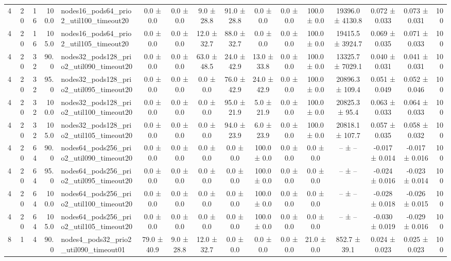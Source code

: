 \begin{tabular}{r r r r l c c c c c c c c c c r}
4 & 20 & 16 & 100.0 & nodes16\_pods64\_prio2\_util100\_timeout20 & 0.0 ± 0.0 & 0.0 ± 0.0 & 9.0 ± 28.8 & 91.0 ± 28.8 & 0.0 ± 0.0 & 0.0 ± 0.0 & 100.0 ± 0.0 & 19396.0 ± 4130.8 & 0.072 ± 0.033 & 0.073 ± 0.031 & 100 \\
4 & 20 & 16 & 105.0 & nodes16\_pods64\_prio2\_util105\_timeout20 & 0.0 ± 0.0 & 0.0 ± 0.0 & 12.0 ± 32.7 & 88.0 ± 32.7 & 0.0 ± 0.0 & 0.0 ± 0.0 & 100.0 ± 0.0 & 19415.5 ± 3924.7 & 0.069 ± 0.035 & 0.071 ± 0.033 & 100 \\
4 & 20 & 32 & 90.0 & nodes32\_pods128\_prio2\_util090\_timeout20 & 0.0 ± 0.0 & 0.0 ± 0.0 & 63.0 ± 48.5 & 24.0 ± 42.9 & 13.0 ± 33.8 & 0.0 ± 0.0 & 100.0 ± 0.0 & 13325.7 ± 7029.1 & 0.040 ± 0.031 & 0.041 ± 0.031 & 100 \\
4 & 20 & 32 & 95.0 & nodes32\_pods128\_prio2\_util095\_timeout20 & 0.0 ± 0.0 & 0.0 ± 0.0 & 0.0 ± 0.0 & 76.0 ± 42.9 & 24.0 ± 42.9 & 0.0 ± 0.0 & 100.0 ± 0.0 & 20896.3 ± 109.4 & 0.051 ± 0.049 & 0.052 ± 0.046 & 100 \\
4 & 20 & 32 & 100.0 & nodes32\_pods128\_prio2\_util100\_timeout20 & 0.0 ± 0.0 & 0.0 ± 0.0 & 0.0 ± 0.0 & 95.0 ± 21.9 & 5.0 ± 21.9 & 0.0 ± 0.0 & 100.0 ± 0.0 & 20825.3 ± 95.4 & 0.063 ± 0.033 & 0.064 ± 0.033 & 100 \\
4 & 20 & 32 & 105.0 & nodes32\_pods128\_prio2\_util105\_timeout20 & 0.0 ± 0.0 & 0.0 ± 0.0 & 0.0 ± 0.0 & 94.0 ± 23.9 & 6.0 ± 23.9 & 0.0 ± 0.0 & 100.0 ± 0.0 & 20818.1 ± 107.7 & 0.057 ± 0.035 & 0.058 ± 0.032 & 100 \\
4 & 20 & 64 & 90.0 & nodes64\_pods256\_prio2\_util090\_timeout20 & 0.0 ± 0.0 & 0.0 ± 0.0 & 0.0 ± 0.0 & 0.0 ± 0.0 & 100.0 ± 0.0 & 0.0 ± 0.0 & 0.0 ± 0.0 & -- ± -- & -0.017 ± 0.014 & -0.017 ± 0.016 & 100 \\
4 & 20 & 64 & 95.0 & nodes64\_pods256\_prio2\_util095\_timeout20 & 0.0 ± 0.0 & 0.0 ± 0.0 & 0.0 ± 0.0 & 0.0 ± 0.0 & 100.0 ± 0.0 & 0.0 ± 0.0 & 0.0 ± 0.0 & -- ± -- & -0.024 ± 0.016 & -0.023 ± 0.014 & 100 \\
4 & 20 & 64 & 100.0 & nodes64\_pods256\_prio2\_util100\_timeout20 & 0.0 ± 0.0 & 0.0 ± 0.0 & 0.0 ± 0.0 & 0.0 ± 0.0 & 100.0 ± 0.0 & 0.0 ± 0.0 & 0.0 ± 0.0 & -- ± -- & -0.028 ± 0.018 & -0.026 ± 0.015 & 100 \\
4 & 20 & 64 & 105.0 & nodes64\_pods256\_prio2\_util105\_timeout20 & 0.0 ± 0.0 & 0.0 ± 0.0 & 0.0 ± 0.0 & 0.0 ± 0.0 & 100.0 ± 0.0 & 0.0 ± 0.0 & 0.0 ± 0.0 & -- ± -- & -0.030 ± 0.019 & -0.029 ± 0.016 & 100 \\
8 & 1 & 4 & 90.0 & nodes4\_pods32\_prio2\_util090\_timeout01 & 79.0 ± 40.9 & 9.0 ± 28.8 & 12.0 ± 32.7 & 0.0 ± 0.0 & 0.0 ± 0.0 & 0.0 ± 0.0 & 21.0 ± 0.0 & 852.7 ± 39.1 & 0.024 ± 0.023 & 0.025 ± 0.023 & 100 \\

\end{tabular}
